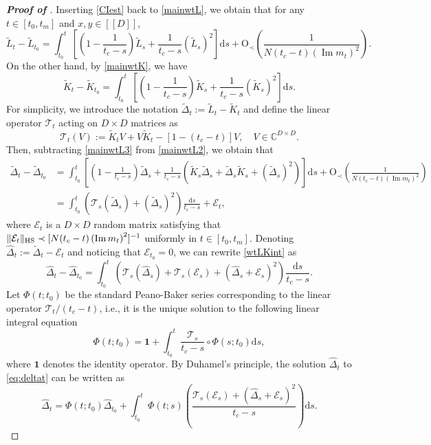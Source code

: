 \documentclass[10pt,reqno]{amsart}
\numberwithin{equation}{section}
\numberwithin{figure}{section}
\theoremstyle{plain} %
\theoremstyle{definition} %
\newcommand{\cal}{\mathcal}
\newcommand{\wh}{\widehat}
\newcommand{\wt}{\widetilde}
\renewcommand{\txt}[1]{\text{\rm{#1}}}
\newcommand{\C}{\mathbb{C}}
\newcommand{\dd}{\mathrm{d}}
\newcommand{\qq}[1]{[\![{#1}]\!]}
\newcommand{\pa}[1]{\left({#1}\right)}
\DeclareMathOperator{\im}{\mathrm{Im}}
\newcommand{\be}{\begin{equation}}
\newcommand{\ee}{\end{equation}}
\newcommand{\OO}{\mathrm{O}}
\newcommand{\HS}{\txt{HS}}
\numberwithin{equation}{section}
\begin{document}
\begin{proof}[\bf Proof of ]
Inserting \eqref{CIest} back to \eqref{mainwtL}, we obtain that for any $t\in [t_0 , t_m]$ and $x,y \in \qq D$,
\be\label{mainwtL2}
 \widetilde{L}_{t }- \widetilde{L}_{t_0 }
=\int_{t_0}^{t} \left[\left(1 - \frac{1}{t_c-s}\right) \widetilde{L}_{s}  + \frac{1}{t_c-s}   (\widetilde{L}_{s} )^2 \right] \dd s+\OO_\prec \left(\frac1{N(t_c-t)\pa{\im m_t}^2 }\right) .
\ee
On the other hand, by \eqref{mainwtK}, we have
\be\label{mainwtL3} 
 \widetilde{K}_{t }- \widetilde{K}_{t_0 }
=\int_{t_0}^{t} \left[\left(1 - \frac{1}{t_c-s}\right) \widetilde{K}_{s}  + \frac{1}{t_c-s} (\widetilde{K}_{s})^2\right] \dd s.
\ee
For simplicity, we introduce the notation $ \wt \Delta_t:= \wt L_t-\wt K_t$ and define the linear operator 
$\cal T_t$ acting on $D\times D$ matrices as 
\be\label{eq:TtV}
\cal T_t(V):=\wt K_t  V+V\wt K_t - [1-(t_c-t)] V,\quad V\in \C^{D\times D}.
\ee
Then, subtracting \eqref{mainwtL3} from \eqref{mainwtL2}, we obtain that
\begin{align}
\widetilde{\Delta}_{t }- \widetilde{\Delta}_{t_0} &=\int_{t_0}^{t} \left[\left(1 - \frac{1}{t_c-s}\right) \widetilde{\Delta}_{s}  + \frac{1}{t_c-s} \left(\widetilde{K}_{s}\widetilde{\Delta}_{s}+ \widetilde{\Delta}_{s}\widetilde{K}_{s} + (\widetilde{\Delta}_{s})^2\right)\right] \dd s  +\OO_\prec \left(\frac1{N(t_c-t)\pa{\im m_t}^2 }\right)\nonumber \\
&=\int_{t_0}^{t} \left( \cal T_s( \widetilde{\Delta}_s)  +  (\widetilde{\Delta}_s)^2\right) 
 \frac{\dd s}{t_c-s}+\cal E_{t},\label{wtLKint}
\end{align}
where $\cal E_{t}$ is a $D\times D$ random matrix satisfying that $\|\cal E_{t}\|_{\HS} \prec [N(t_c-t)\pa{\im m_t}^2]^{-1} $ uniformly in $t\in [t_0 , t_m]$.
Denoting ${\wh \Delta}_t:=\wt\Delta_t-\cal E_t$ and noticing that $\cal E_{t_0}=0$, we can rewrite \eqref{wtLKint} as
\be\label{eq:deltat}
{{\wh \Delta}}_{t} - {\wh \Delta}_{t_0} = \int_{t_0}^{t} \left( \mathcal{T}_s({\wh \Delta}_s)+ \mathcal{T}_s(\mathcal{E}_s) + ({\wh \Delta}_s + \mathcal{E}_s)^2 \right) \frac{\dd s}{t_c-s }.
\ee
Let $\Phi\left(t ; t_0\right)$ be the standard Peano-Baker series corresponding to the linear operator $\cal  T_t/(t_c-t)$, i.e., it is the unique solution to the following linear integral equation
\be\label{eq:PBintegral}
\Phi \left(t ; t_0\right)=\mathbf{1}+\int_{t_0}^t \frac{\cal T_s}{t_c-s}\circ \Phi \left(s ; t_0\right) \mathrm{d} s ,%
\ee
where $\mathbf{1}$ denotes the identity operator. By Duhamel's principle, the solution ${\wh \Delta}_t$ to \eqref{eq:deltat} can be written as 
\be\label{LKE}
{\wh \Delta}_{t }
=\Phi \left(t  ; t_0\right) {\wh \Delta}_{t_0}+\int_{t_0}^t \Phi \left(t ; s\right) \left(\frac{\mathcal{T}_s(\mathcal{E}_s) + ({\wh \Delta}_s + \mathcal{E}_s)^2}{t_c-s} \right) \mathrm{d} s.\ee


\end{proof}
\end{document}
